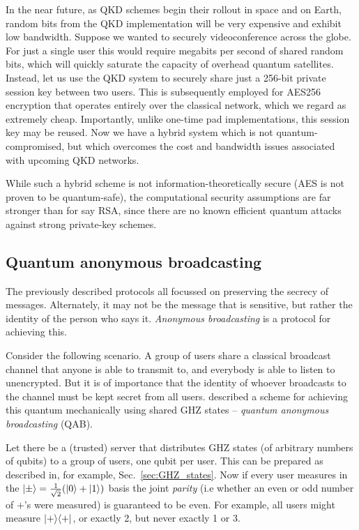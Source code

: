 In the near future, as QKD schemes begin their rollout in space and on Earth, random bits from the QKD implementation will be very expensive and exhibit low bandwidth. Suppose we wanted to securely videoconference across the globe. For just a single user this would require megabits per second of shared random bits, which will quickly saturate the capacity of overhead quantum satellites. Instead, let us use the QKD system to securely share just a 256-bit private session key between two users. This is subsequently employed for AES256 encryption that operates entirely over the classical network, which we regard as extremely cheap. Importantly, unlike one-time pad implementations, this session key may be reused. Now we have a hybrid system which is not quantum-compromised, but which overcomes the cost and bandwidth issues associated with upcoming QKD networks.

While such a hybrid scheme is not information-theoretically secure (AES is not proven to be quantum-safe), the computational security assumptions are far stronger than for say RSA, since there are no known efficient quantum attacks against strong private-key schemes.

%
%

\subsection{Quantum anonymous broadcasting} \label{sec:anon_broad} 

The previously described protocols all focussed on preserving the secrecy of messages. Alternately, it may not be the message that is sensitive, but rather the identity of the person who says it. \textit{Anonymous broadcasting} is a protocol for achieving this.

Consider the following scenario. A group of users share a classical broadcast channel that anyone is able to transmit to, and everybody is able to listen to unencrypted. But it is of importance that the identity of whoever broadcasts to the channel must be kept secret from all users. \cite{Wehner} described a scheme for achieving this quantum mechanically using shared GHZ states -- \textit{quantum anonymous broadcasting} (QAB).

Let there be a (trusted) server that distributes GHZ states (of arbitrary numbers of qubits) to a group of users, one qubit per user. This can be prepared as described in, for example, Sec.~\ref{sec:GHZ_states}. Now if every user measures in the \mbox{$|\pm\rangle=\frac{1}{\sqrt{2}}(|0\rangle+|1\rangle)$} basis the joint \textit{parity} (i.e whether an even or odd number of $+$'s were measured) is guaranteed to be even. For example, all users might measure $|+\rangle\langle+|$, or exactly 2, but never exactly 1 or 3.

